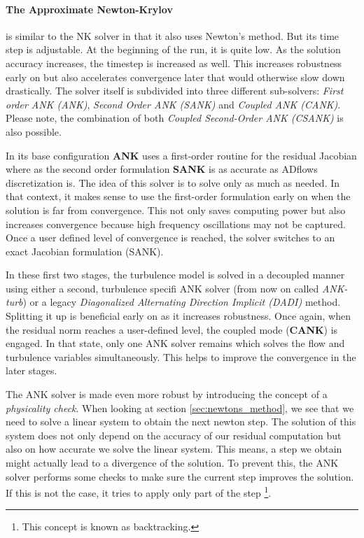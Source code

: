 \paragraph{The Approximate Newton-Krylov} is similar to the NK solver in that
it also uses Newton's method. But its time step is adjustable. At the beginning
of the run, it is quite low. As the solution accuracy increases, the timestep
is increased as well. This increases robustness early on but also accelerates
convergence later that would otherwise slow down drastically. The solver itself
is subdivided into three different sub-solvers: \textit{First order ANK (ANK)},
\textit{Second Order ANK (SANK)} and \textit{Coupled ANK (CANK)}. Please note,
the combination of both \textit{Coupled Second-Order ANK (CSANK)} is also
possible.

In its base configuration \textbf{ANK} uses a first-order routine for the
residual Jacobian where as the second order formulation \textbf{SANK} is as
accurate as ADflows discretization is. The idea of this solver is to solve only
as much as needed. In that context, it makes sense to use the first-order
formulation early on when the solution is far from convergence. This not only
saves computing power but also increases convergence because high frequency
oscillations may not be captured. Once a user defined level of convergence is
reached, the solver switches to an exact Jacobian formulation (SANK). 

In these first two stages, the turbulence model is solved in a decoupled manner
using either a second, turbulence specifi ANK solver (from now on called
\textit{ANK-turb}) or a legacy \textit{Diagonalized Alternating Direction
Implicit (DADI)} method. Splitting it up is beneficial early on as it increases
robustness. Once again, when the residual norm reaches a user-defined level,
the coupled mode (\textbf{CANK}) is engaged. In that state, only one ANK
solver remains which solves the flow and turbulence variables simultaneously.
This helps to improve the convergence in the later stages.
\cite{adflow_solvers}

The ANK solver is made even more robust by introducing the concept of a
\textit{physicality check}. When looking at section \ref{sec:newtons_method},
we see that we need to solve a linear system to obtain the next newton step.
The solution of this system does not only depend on the accuracy of our residual
computation but also on how accurate we solve the linear system. This means, a
step we obtain might actually lead to a divergence of the solution. To  prevent
this, the ANK solver performs some checks to make sure the current step
improves the solution. If this is not the case, it tries to apply only part of
the step \footnote{This concept is known as backtracking.}.




